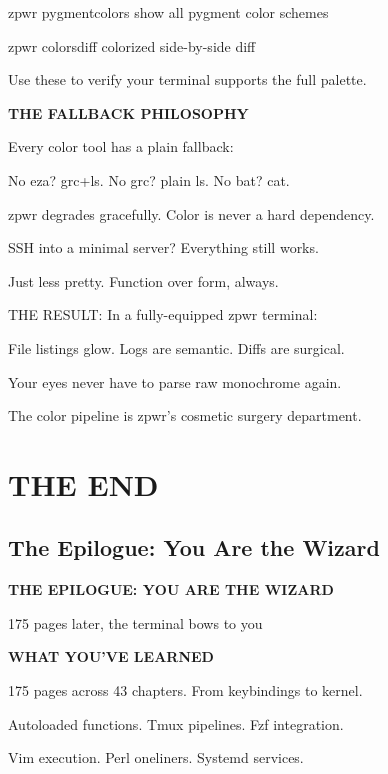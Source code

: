 \documentclass[11pt,a4paper,twoside]{book}
\begin{document}
zpwr pygmentcolors   show all pygment color schemes

zpwr colorsdiff      colorized side-by-side diff

Use these to verify your terminal supports the full palette.


\vspace{12pt}
{\bfseries\color{neonyellow} THE FALLBACK PHILOSOPHY}\vspace{4pt}

Every color tool has a plain fallback:

No eza? grc+ls. No grc? plain ls. No bat? cat.

zpwr degrades gracefully. Color is never a hard dependency.

SSH into a minimal server? Everything still works.

Just less pretty. Function over form, always.

THE RESULT: In a fully-equipped zpwr terminal:

File listings glow. Logs are semantic. Diffs are surgical.

Your eyes never have to parse raw monochrome again.

The color pipeline is zpwr's cosmetic surgery department.


\vspace{16pt}


\chapter{THE END}

\section{The Epilogue: You Are the Wizard}


\vspace{10pt}
{\large\bfseries\color{neoncyan} THE EPILOGUE: YOU ARE THE WIZARD}\vspace{6pt}

175 pages later, the terminal bows to you


\vspace{12pt}
{\bfseries\color{neonyellow} WHAT YOU'VE LEARNED}\vspace{4pt}

175 pages across 43 chapters. From keybindings to kernel.

Autoloaded functions. Tmux pipelines. Fzf integration.

Vim execution. Perl oneliners. Systemd services.
\end{document}
